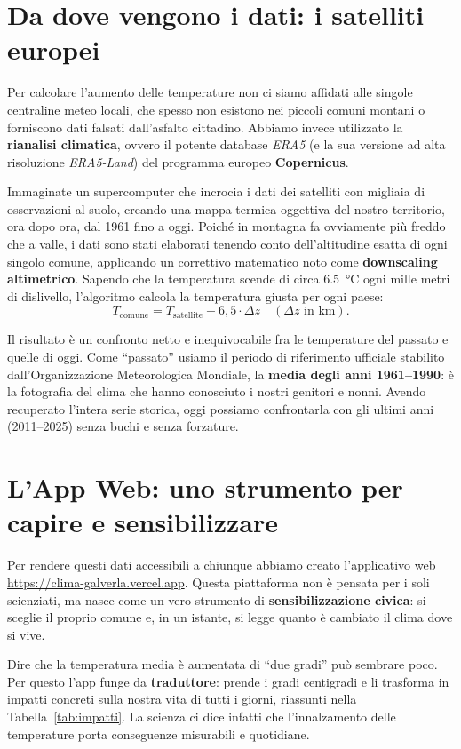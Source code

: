 \documentclass[11pt,a4paper]{article}
\begin{document}
\section{Da dove vengono i dati: i satelliti europei}
Per calcolare l'aumento delle temperature non ci siamo affidati alle singole centraline meteo locali, che spesso non esistono nei piccoli comuni montani o forniscono dati falsati dall'asfalto cittadino. Abbiamo invece utilizzato la \textbf{rianalisi climatica}, ovvero il potente database \textit{ERA5} (e la sua versione ad alta risoluzione \textit{ERA5-Land}) del programma europeo \textbf{Copernicus}.

Immaginate un supercomputer che incrocia i dati dei satelliti con migliaia di osservazioni al suolo, creando una mappa termica oggettiva del nostro territorio, ora dopo ora, dal 1961 fino a oggi. Poiché in montagna fa ovviamente più freddo che a valle, i dati sono stati elaborati tenendo conto dell'altitudine esatta di ogni singolo comune, applicando un correttivo matematico noto come \textbf{downscaling altimetrico}. Sapendo che la temperatura scende di circa \SI{6.5}{\celsius} ogni mille metri di dislivello, l'algoritmo calcola la temperatura giusta per ogni paese:
\begin{equation*}
T_{\text{comune}} = T_{\text{satellite}} - 6{,}5 \cdot \Delta z \quad (\Delta z \text{ in km}).
\end{equation*}

Il risultato è un confronto netto e inequivocabile fra le temperature del passato e quelle di oggi. Come ``passato'' usiamo il periodo di riferimento ufficiale stabilito dall'Organizzazione Meteorologica Mondiale, la \textbf{media degli anni 1961--1990}: è la fotografia del clima che hanno conosciuto i nostri genitori e nonni. Avendo recuperato l'intera serie storica, oggi possiamo confrontarla con gli ultimi anni (2011--2025) senza buchi e senza forzature.

\section{L'App Web: uno strumento per capire e sensibilizzare}
Per rendere questi dati accessibili a chiunque abbiamo creato l'applicativo web \url{https://clima-galverla.vercel.app}. Questa piattaforma non è pensata per i soli scienziati, ma nasce come un vero strumento di \textbf{sensibilizzazione civica}: si sceglie il proprio comune e, in un istante, si legge quanto è cambiato il clima dove si vive.

Dire che la temperatura media è aumentata di ``due gradi'' può sembrare poco. Per questo l'app funge da \textbf{traduttore}: prende i gradi centigradi e li trasforma in impatti concreti sulla nostra vita di tutti i giorni, riassunti nella Tabella~\ref{tab:impatti}. La scienza ci dice infatti che l'innalzamento delle temperature porta conseguenze misurabili e quotidiane.
\end{document}
